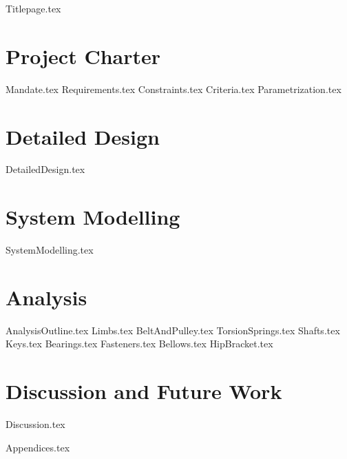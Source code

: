 \documentclass[letterpaper,12pt,onecolumn,titlepage,twoside]{article}
\begin{document}
{Titlepage.tex}

\clearpage\mbox{}\clearpage %


\tableofcontents

\newpage

\listoffigures
\listoftables

\newpage

\clearpage\mbox{}\clearpage %


\section{Project Charter} \label{sec:charter}
{Mandate.tex}
{Requirements.tex}
{Constraints.tex}
{Criteria.tex}
{Parametrization.tex}

\newpage

\section{Detailed Design} \label{sec:detailed_design}
{DetailedDesign.tex}

\newpage

\section{System Modelling} \label{sec:system_modelling}
{SystemModelling.tex}

\newpage

\section{Analysis} \label{sec:analysis}
{AnalysisOutline.tex}
{Limbs.tex}
{BeltAndPulley.tex}
{TorsionSprings.tex}
{Shafts.tex}
{Keys.tex}
{Bearings.tex}
{Fasteners.tex}
{Bellows.tex}
{HipBracket.tex}

\newpage

\section{Discussion and Future Work} \label{sec:dicussion}
{Discussion.tex}

\newpage




\newpage

\begin{appendices}
    {Appendices.tex}
\end{appendices}
\end{document}
